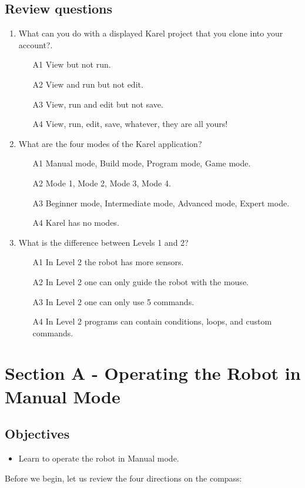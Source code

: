 \documentclass[article,A4,12pt]{llncs}
\begin{document}
\subsection{Review questions}

\begin{enumerate}
\item What can you do with a displayed Karel project that you clone into your account?.
\begin{enumerate}
\item[A1] View but not run.
\item[A2] View and run but not edit.
\item[A3] View, run and edit but not save.
\item[A4] View, run, edit, save, whatever, they are all yours!
\end{enumerate}
\item What are the four modes of the Karel application?
\begin{enumerate}
\item[A1] Manual mode, Build mode, Program mode, Game mode.
\item[A2] Mode 1, Mode 2, Mode 3, Mode 4.
\item[A3] Beginner mode, Intermediate mode, Advanced mode, Expert mode.
\item[A4] Karel has no modes.
\end{enumerate}
\item What is the difference between Levels 1 and 2?
\begin{enumerate}
\item[A1] In Level 2 the robot has more sensors. 
\item[A2] In Level 2 one can only guide the robot with the mouse.
\item[A3] In Level 2 one can only use 5 commands.
\item[A4] In Level 2 programs can contain 
      conditions, loops, and custom commands.
\end{enumerate}
\end{enumerate}


\section{Section A - Operating the Robot in Manual Mode}

\subsection{Objectives} 
\begin{itemize}
\item Learn to operate the robot in Manual mode.
\end{itemize}
\noindent
Before we begin, let us review the four directions on the compass:
\end{document}
